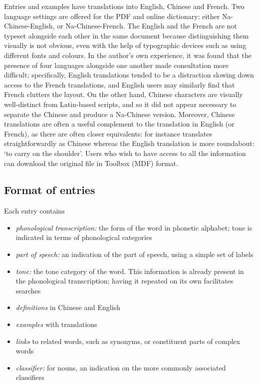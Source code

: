 Entries and examples have translations into English, Chinese and French. Two language settings are offered for the PDF and online dictionary: either Na-Chinese-English, or Na-Chinese-French. The English and the French are not typeset alongside each other in the same document because distinguishing them visually is not obvious, even with the help of typographic devices such as using different fonts and colours. In the author's own experience, it was found that the presence of four languages alongside one another made consultation more difficult; specifically, English translations tended to be a distraction slowing down access to the French translations, and English users may similarly find that French clutters the layout. On the other hand, Chinese characters are visually well-distinct from Latin-based scripts, and so it did not appear necessary to separate the Chinese and produce a Na-Chinese version. Moreover, Chinese translations are often a useful complement to the translation in English (or French), as there are often closer equivalents: for instance  translates straightforwardly as Chinese  whereas the English translation is more roundabout: ‘to carry on the shoulder'. Users who wish to have access to all the information can download the original file in Toolbox (MDF) format. 

	\subsection{Format of entries} \label{sec:entries}

Each entry contains
\begin{itemize}
	\item \textit{phonological transcription:} the form of the word in phonetic alphabet; tone is indicated in terms of phonological categories
	\item \textit{part of speech:} an indication of the part of speech, using a simple set of labels
	\item \textit{tone:} the tone category of the word. This information is already present in the phonological transcription; having it repeated on its own facilitates searches
	\item \textit{definitions} in Chinese and English
	\item \textit{examples} with translations
	\item \textit{links} to related words, such as synonyms, or constituent parts of complex words 
	\item \textit{classifier:} for nouns, an indication on the more commonly associated classifiers
\end{itemize}

